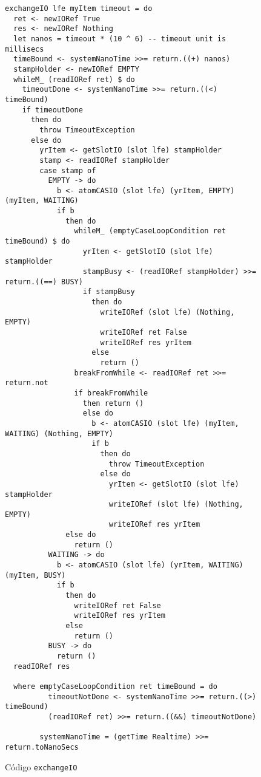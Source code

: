 \begin{figure}[H]
  \centering
  \begin{verbatim}
exchangeIO lfe myItem timeout = do
  ret <- newIORef True
  res <- newIORef Nothing
  let nanos = timeout * (10 ^ 6) -- timeout unit is millisecs
  timeBound <- systemNanoTime >>= return.((+) nanos)
  stampHolder <- newIORef EMPTY
  whileM_ (readIORef ret) $ do
    timeoutDone <- systemNanoTime >>= return.((<) timeBound)
    if timeoutDone
      then do
        throw TimeoutException
      else do
        yrItem <- getSlotIO (slot lfe) stampHolder
        stamp <- readIORef stampHolder
        case stamp of
          EMPTY -> do
            b <- atomCASIO (slot lfe) (yrItem, EMPTY) (myItem, WAITING)
            if b
              then do
                whileM_ (emptyCaseLoopCondition ret timeBound) $ do
                  yrItem <- getSlotIO (slot lfe) stampHolder
                  stampBusy <- (readIORef stampHolder) >>= return.((==) BUSY)
                  if stampBusy
                    then do
                      writeIORef (slot lfe) (Nothing, EMPTY)
                      writeIORef ret False
                      writeIORef res yrItem
                    else
                      return ()
                breakFromWhile <- readIORef ret >>= return.not
                if breakFromWhile
                  then return ()
                  else do
                    b <- atomCASIO (slot lfe) (myItem, WAITING) (Nothing, EMPTY)
                    if b
                      then do
                        throw TimeoutException
                      else do
                        yrItem <- getSlotIO (slot lfe) stampHolder
                        writeIORef (slot lfe) (Nothing, EMPTY)
                        writeIORef res yrItem
              else do
                return ()
          WAITING -> do
            b <- atomCASIO (slot lfe) (yrItem, WAITING) (myItem, BUSY)
            if b
              then do
                writeIORef ret False
                writeIORef res yrItem
              else
                return ()
          BUSY -> do
            return ()
  readIORef res

  where emptyCaseLoopCondition ret timeBound = do
          timeoutNotDone <- systemNanoTime >>= return.((>) timeBound)
          (readIORef ret) >>= return.((&&) timeoutNotDone)

        systemNanoTime = (getTime Realtime) >>= return.toNanoSecs
  \end{verbatim}
  \caption{Código \texttt{exchangeIO}}
  \label{fig:exchange-io}
\end{figure}


